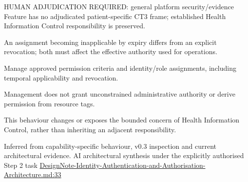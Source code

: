 HUMAN ADJUDICATION REQUIRED: general platform security/\allowbreak{}evidence Feature has no adjudicated patient-specific CT3 frame; established Health Information Control responsibility is preserved.



An assignment becoming inapplicable by expiry differs from an explicit revocation; both must affect the effective authority used for operations.



Manage approved permission criteria and identity/\allowbreak{}role assignments, including temporal applicability and revocation.



Management does not grant unconstrained administrative authority or derive permission from resource tags.



This behaviour changes or exposes the bounded concern of Health Information Control, rather than inheriting an adjacent responsibility.


Inferred from capability-specific behaviour, v0.3 inspection and current architectural evidence. AI architectural synthesis under the explicitly authorised Step 2 task \hyperref[evidence:13afd583ac468df7]{DesignNote-Identity-Authentication-and-Authorisation-Architecture.md:33}

